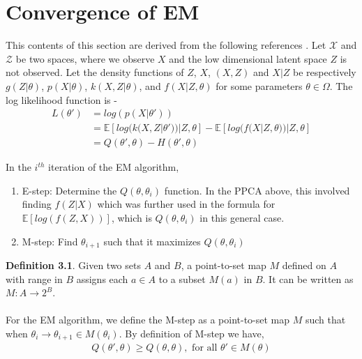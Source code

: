 

\section{Convergence of EM}

This contents of this section are derived from the following references \cite{tipping1999probabilistic, roweis1997algorithms, dempster1977maximum, zangwill1967non, rao1973linear, wu1983convergence}. Let $\mathcal{X}$ and $\mathcal{Z}$ be two spaces, where we observe $X$ and the low dimensional latent space $Z$ is not observed. Let the density functions of $Z$, $X$, $(X,Z)$ and $X|Z$ be respectively $g(Z|\theta)$, $p(X|\theta)$, $k(X,Z|\theta)$, and $f(X|Z,\theta)$ for some parameters $\theta \in \Omega$. 
The log likelihood function is - 
\begin{align*}
	L(\theta') &= log(p(X|\theta')) \\
			&= \mathbb{E}[log(k(X,Z|\theta'))|Z, \theta] - \mathbb{E}[log(f(X|Z, \theta))|Z, \theta]\\
			&= Q(\theta',\theta) - H(\theta', \theta)
\end{align*}

In the $i^{th}$ iteration of the EM algorithm, 
\begin{enumerate}
	\item E-step: Determine the $Q(\theta,\theta_i)$ function. In the PPCA above, this involved finding $f(Z|X)$ which was further used in the formula for $\mathbb{E}[log(f(Z,X))]$, which is $Q(\theta,\theta_i)$ in this general case.
	\item M-step: Find $\theta_{i+1}$ such that it maximizes $Q(\theta,\theta_i)$
\end{enumerate}

\textbf{Definition 3.1}. Given two sets $A$ and $B$, a point-to-set map $M$ defined on $A$ with range in $B$ assigns each $a \in A$ to a subset $M(a)$ in $B$. It can be written as $M: A \rightarrow 2^B$.
\\\\ For the EM algorithm, we define the M-step as a point-to-set map $M$ such that when $\theta_i \rightarrow \theta_{i+1} \in M(\theta_i)$. By definition of M-step we have,
\begin{align}
	Q(\theta',\theta) \geq Q(\theta,\theta), \text{   for all  } \theta' \in M(\theta)
\end{align}\\


